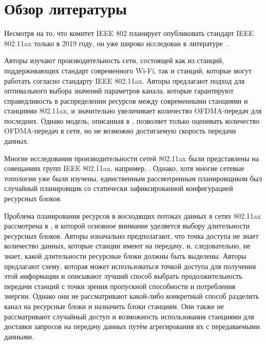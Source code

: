 \section{Обзор литературы}
\label{sec:litra}

Несмотря на то, что комитет IEEE 802 планирует опубликовать стандарт IEEE 802.11ax только в 2019 году, он уже широко исследован в литературе~\cite{khorov2016several, ofdma-par1, ofdma-par2, karaca2016resource, lanante2017performance}. 

Авторы \cite{khorov2016several} изучают производительность сети, состоящей как из станций, поддерживающих стандарт современного Wi-Fi, так и станций, которые могут работать согласно стандарту IEEE 802.11ax. 
Авторы предлагают подход для оптимального выбора значений параметров канала, которые гарантируют справедливость в распределении ресурсов между современными станциями и станциями 802.11ax, и значительно увеличивает количество OFDMA-передач для последних. 
Однако модель, описанная в \cite{khorov2016several}, позволяет только оценивать количество OFDMA-передач в сети, но не возможно достигаемую скорость передачи данных. 

Многие исследования производительности сетей 802.11ax были представлены на совещаниях групп IEEE 802.11ax, например, \cite{ofdma-par1, ofdma-par2}. 
Однако, хотя многие сетевые топологии уже были изучены, единственным рассмотренным планировщиком был случайный планировщик со статически зафиксированной конфигурацией ресурсных блоков.
 
Проблема планирования ресурсов в восходящих потоках данных в сетях 802.11ax рассмотрена в  \cite{karaca2016resource}, в которой основное внимание уделяется выбору длительности ресурсных блоков. 
Авторы изначально предполагают, что точка доступа не знает количество данных, которые станции имеют на передачу, и, следовательно, не знает, какой длительности ресурсные блоки должны быть выделены. 
Авторы предлагают схему, которая может использоваться точкой доступа для получения этой информации и описывают лучший способ выбрать продолжительность передачи станций с точки зрения пропускной способности и потребления энергии.
Однако они не рассматривают какой-либо конкретный способ разделить канал на ресурсные блоки и назначить блоки станциям. 
Они также не рассматривают случайный доступ и возможность использования станциями для доставки запросов на передачу данных путём агрегирования их с передаваемыми данными.

